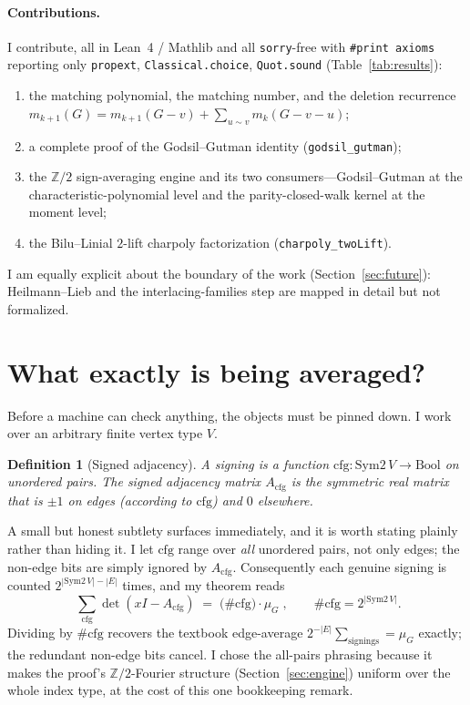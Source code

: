 \documentclass[11pt]{article}
\newtheorem{definition}{Definition}
\newcommand{\lean}[1]{\texttt{#1}}
\newcommand{\Z}{\mathbb{Z}}
\begin{document}
\paragraph{Contributions.}
I contribute, all in Lean~4 / Mathlib and all \lean{sorry}-free with
\lean{\#print axioms} reporting only \lean{propext}, \lean{Classical.choice},
\lean{Quot.sound} (Table~\ref{tab:results}):
\begin{enumerate}\itemsep2pt
\item the matching polynomial, the matching number, and the deletion
  recurrence $m_{k+1}(G)=m_{k+1}(G{-}v)+\sum_{u\sim v}m_k(G{-}v{-}u)$;
\item a complete proof of the Godsil--Gutman identity (\lean{godsil\_gutman});
\item the $\Z/2$ sign-averaging engine and its two consumers---Godsil--Gutman
  at the characteristic-polynomial level and the parity-closed-walk kernel at
  the moment level;
\item the Bilu--Linial $2$-lift charpoly factorization
  (\lean{charpoly\_twoLift}).
\end{enumerate}
I am equally explicit about the boundary of the work
(Section~\ref{sec:future}): Heilmann--Lieb and the interlacing-families step are
mapped in detail but not formalized.



\section{What exactly is being averaged?}
\label{sec:setting}

Before a machine can check anything, the objects must be pinned down. I work
over an arbitrary finite vertex type $V$.

\begin{definition}[Signed adjacency]
A signing is a function $\mathrm{cfg}\colon \mathrm{Sym2}\,V\to\mathrm{Bool}$ on
unordered pairs. The signed adjacency matrix $A_{\mathrm{cfg}}$ is the symmetric
real matrix that is $\pm1$ on edges (according to $\mathrm{cfg}$) and $0$
elsewhere.
\end{definition}

A small but honest subtlety surfaces immediately, and it is worth stating
plainly rather than hiding it. I let $\mathrm{cfg}$ range over \emph{all}
unordered pairs, not only edges; the non-edge bits are simply ignored by
$A_{\mathrm{cfg}}$. Consequently each genuine signing is counted
$2^{|\mathrm{Sym2}\,V|-|E|}$ times, and my theorem reads
\[
  \boxed{\;\sum_{\mathrm{cfg}}\det(xI-A_{\mathrm{cfg}})
  \;=\;\bigl(\#\mathrm{cfg}\bigr)\cdot \mu_G\;},
  \qquad \#\mathrm{cfg}=2^{|\mathrm{Sym2}\,V|}.
\]
Dividing by $\#\mathrm{cfg}$ recovers the textbook edge-average
$2^{-|E|}\sum_{\text{signings}}=\mu_G$ exactly; the redundant non-edge bits
cancel. I chose the all-pairs phrasing because it makes the proof's
$\Z/2$-Fourier structure (Section~\ref{sec:engine}) uniform over the whole
index type, at the cost of this one bookkeeping remark.
\end{document}
